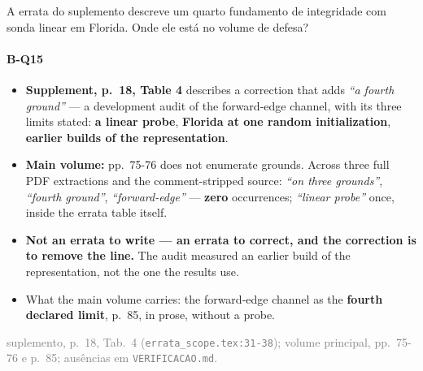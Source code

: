 \documentclass{beamer}
\begin{document}
\begin{frame}[noframenumbering]{A errata do suplemento descreve um quarto fundamento de integridade com sonda linear em Florida. Onde ele está no volume de defesa?}
    \framesubtitle{B-Q15}
    \hypertarget{bq15}{}
    \small\begin{itemize}\setlength{\itemsep}{0pt}\setlength{\parskip}{0pt}
        \item \textbf{Supplement, p.~18, Table 4} describes a correction that adds \textit{``a fourth ground''} --- a development audit of the forward-edge channel, with its three limits stated: \textbf{a linear probe}, \textbf{Florida at one random initialization}, \textbf{earlier builds of the representation}.
        \item \textbf{Main volume:} pp.~75-76 does not enumerate grounds. Across three full PDF extractions and the comment-stripped source: \textit{``on three grounds''}, \textit{``fourth ground''}, \textit{``forward-edge''} --- \textbf{zero} occurrences; \textit{``linear probe''} once, inside the errata table itself.
        \item \textcolor{alert}{\textbf{Not an errata to write --- an errata to correct, and the correction is to remove the line.}} The audit measured an earlier build of the representation, not the one the results use.
        \item What the main volume carries: the forward-edge channel as the \textbf{fourth declared limit}, p.~85, in prose, without a probe.
    \end{itemize}
    \vfill
    {\scriptsize
    \begin{minipage}[b]{0.775\linewidth}\raggedright\textcolor{gray}{suplemento, p.~18, Tab.~4 (\texttt{errata\_scope.tex:31-38}); volume principal, pp.~75-76 e p.~85; ausências em \texttt{VERIFICACAO.md}.}\end{minipage}\hfill
    \begin{minipage}[b]{0.20\linewidth}\raggedleft \hyperlink{b0}{}\end{minipage}}
\end{frame}
\end{document}
